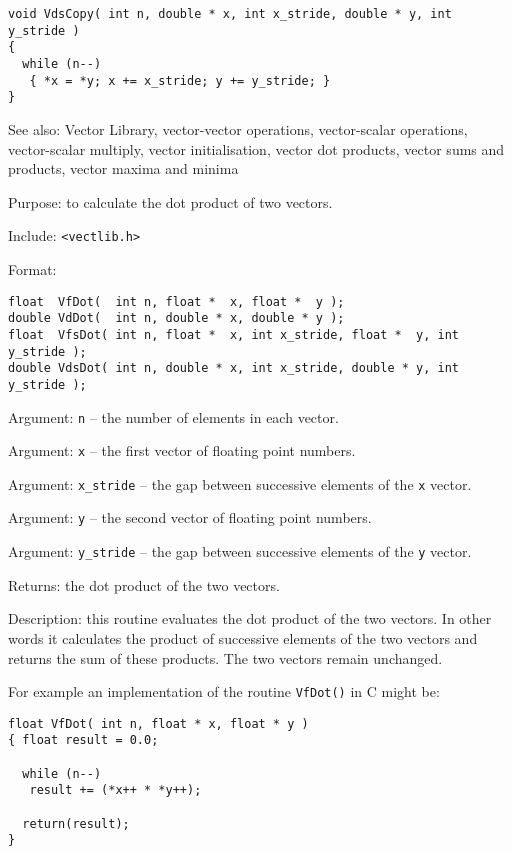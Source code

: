 \begin{verbatim}
void VdsCopy( int n, double * x, int x_stride, double * y, int y_stride )
{
  while (n--)
   { *x = *y; x += x_stride; y += y_stride; }
} 
\end{verbatim}

See also: Vector Library, vector-vector operations, vector-scalar
operations, vector-scalar multiply, vector initialisation, vector dot
products, vector sums and products, vector maxima and minima


Purpose: to calculate the dot product of two vectors.

Include: \verb+<vectlib.h>+

Format:

\begin{verbatim}
float  VfDot(  int n, float *  x, float *  y );
double VdDot(  int n, double * x, double * y );
float  VfsDot( int n, float *  x, int x_stride, float *  y, int y_stride );
double VdsDot( int n, double * x, int x_stride, double * y, int y_stride );
\end{verbatim}

Argument: {\tt n} -- the number of elements in each vector.

Argument: {\tt x} -- the first vector of floating point numbers.

Argument: \verb+x_stride+ -- the gap between successive elements of the
{\tt x} vector.

Argument: {\tt y} -- the second vector of floating point numbers.

Argument: \verb+y_stride+ -- the gap between successive elements of
the {\tt y} vector.

Returns: the dot product of the two vectors.

Description: this routine evaluates the dot product of the two vectors.
In other words it calculates the product of successive elements of the
two vectors and returns the sum of these products. The two vectors
remain unchanged.

For example an implementation of the routine {\tt VfDot()} in C might be:

\begin{verbatim}
float VfDot( int n, float * x, float * y )
{ float result = 0.0;

  while (n--)
   result += (*x++ * *y++);
 
  return(result);
}
\end{verbatim}

